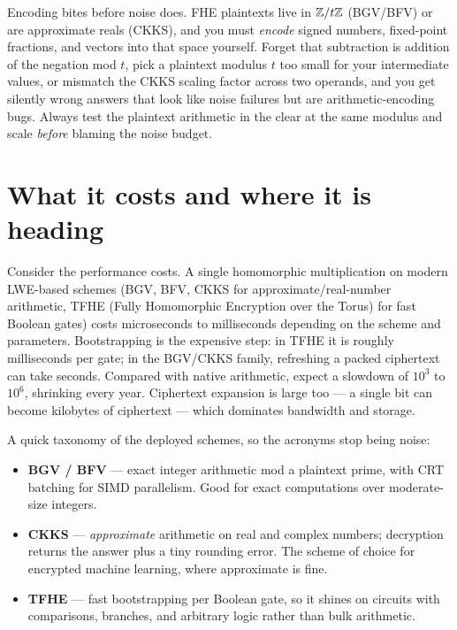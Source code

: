 \begin{trapbox}
Encoding bites before noise does. FHE plaintexts live in $\mathbb{Z}/t\mathbb{Z}$ (BGV/BFV) or are approximate reals (CKKS), and you must \emph{encode} signed numbers, fixed-point fractions, and vectors into that space yourself. Forget that subtraction is addition of the negation mod $t$, pick a plaintext modulus $t$ too small for your intermediate values, or mismatch the CKKS scaling factor across two operands, and you get silently wrong answers that look like noise failures but are arithmetic-encoding bugs. Always test the plaintext arithmetic in the clear at the same modulus and scale \emph{before} blaming the noise budget.
\end{trapbox}

\section{What it costs and where it is heading}
\label{ch33:cost}

Consider the performance costs. A single homomorphic multiplication on modern LWE-based schemes (BGV, BFV, CKKS for approximate/real-number arithmetic, TFHE (Fully Homomorphic Encryption over the Torus) for fast Boolean gates) costs microseconds to milliseconds depending on the scheme and parameters. Bootstrapping is the expensive step: in TFHE it is roughly milliseconds per gate; in the BGV/CKKS family, refreshing a packed ciphertext can take seconds. Compared with native arithmetic, expect a slowdown of $10^3$ to $10^6$, shrinking every year. Ciphertext expansion is large too --- a single bit can become kilobytes of ciphertext --- which dominates bandwidth and storage.

\begin{focusbox}
A quick taxonomy of the deployed schemes, so the acronyms stop being noise:
\begin{itemize}
  \item \textbf{BGV / BFV} --- exact integer arithmetic mod a plaintext prime, with CRT batching for SIMD parallelism. Good for exact computations over moderate-size integers.
  \item \textbf{CKKS} --- \emph{approximate} arithmetic on real and complex numbers; decryption returns the answer plus a tiny rounding error. The scheme of choice for encrypted machine learning, where approximate is fine.
  \item \textbf{TFHE} --- fast bootstrapping per Boolean gate, so it shines on circuits with comparisons, branches, and arbitrary logic rather than bulk arithmetic.
\end{itemize}
\end{focusbox}

